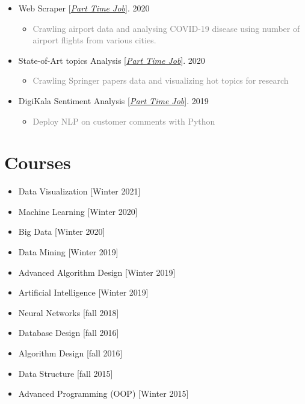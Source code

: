 \documentclass[10pt,a4paper,sans]{moderncv} %
\begin{document}
\begin{itemize}
		\item Web Scraper [\href{mailto:mbahmanabadi96@gmail.com}{\emph{Part Time Job}}]. \hfill 2020
		\begin{itemize}
			\item \textcolor{gray} {Crawling airport data and analysing COVID-19 disease using number of airport flights from various cities.}
		\end{itemize}

		\item State-of-Art topics Analysis [\href{mailto:mbahmanabadi96@gmail.com}{\emph{Part Time Job}}]. \hfill 2020
		\begin{itemize}
			\item \textcolor{gray} {Crawling Springer papers data and visualizing hot topics for research}
		\end{itemize}
		
		\item DigiKala Sentiment Analysis [\href{mailto:mbahmanabadi96@gmail.com}{\emph{Part Time Job}}]. \hfill 2019
		\begin{itemize}
			\item \textcolor{gray} {Deploy NLP on customer comments with Python}
		\end{itemize}		

	\end{itemize}


	
	\section{Courses}
	\begin{multicols}{2}
		\begin{itemize}
			\item {} Data Visualization \hfill[Winter 2021]
			\item {} Machine Learning \hfill[Winter 2020]
			\item {} Big Data \hfill[Winter 2020]
			\item {} Data Mining \hfill[Winter 2019]
			\item {} Advanced Algorithm Design \hfill[Winter 2019]
			\item {} Artificial Intelligence \hfill[Winter 2019]
			\item {} Neural Networks \hfill[fall 2018]
			\item {} Database Design \hfill[fall 2016]
			\item {} Algorithm Design \hfill[fall 2016]	
			\item {} Data Structure \hfill[fall 2015]
			\item {} Advanced Programming (OOP) \hfill[Winter 2015]
		\end{itemize}
	\end{multicols}
	
\end{document}
